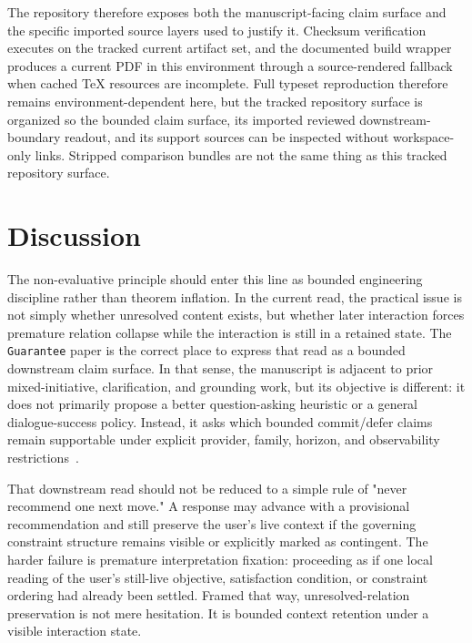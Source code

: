 \documentclass[11pt]{article}
\begin{document}
The repository therefore exposes both the manuscript-facing claim surface and
the specific imported source layers used to justify it. Checksum verification
executes on the tracked current artifact set, and the documented build wrapper
produces a current PDF in this environment through a source-rendered fallback
when cached TeX resources are incomplete. Full typeset reproduction therefore
remains environment-dependent here, but the tracked repository surface is
organized so the bounded claim surface, its imported reviewed downstream-
boundary readout, and its support sources can be inspected without workspace-
only links. Stripped comparison bundles are not the same thing as this tracked
repository surface.

\section{Discussion}

The non-evaluative principle should enter this line as bounded engineering
discipline rather than theorem inflation. In the current read, the practical issue
is not simply whether unresolved content exists, but whether later interaction
forces premature relation collapse while the interaction is still in a retained
state. The \texttt{Guarantee} paper is the correct place to express that read as
a bounded downstream claim surface. In that sense, the manuscript is adjacent to
prior mixed-initiative, clarification, and grounding work, but its objective is
different: it does not primarily propose a better question-asking heuristic or a
general dialogue-success policy. Instead, it asks which bounded commit/defer
claims remain supportable under explicit provider, family, horizon, and
observability restrictions~\cite{chucarroll2000mimic,deboni2003clarification,rao2018evpi,benotti2021grounding,sahay-etal-2025-ask,wen-etal-2025-know,madhusudhan-etal-2025-llms}.

That downstream read should not be reduced to a simple rule of "never recommend
one next move." A response may advance with a provisional recommendation and
still preserve the user's live context if the governing constraint structure
remains visible or explicitly marked as contingent. The harder failure is
premature interpretation fixation: proceeding as if one local reading of the
user's still-live objective, satisfaction condition, or constraint ordering had
already been settled. Framed that way, unresolved-relation preservation is not
mere hesitation. It is bounded context retention under a visible interaction
state.
\end{document}
